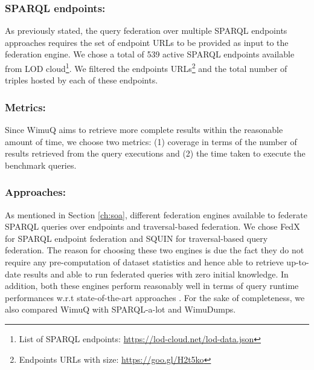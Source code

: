 \subsubsection{SPARQL endpoints:} As previously stated, the query federation over multiple SPARQL endpoints approaches requires the set of endpoint URLs to be provided as input to the federation engine. We chose a total of 539 active SPARQL endpoints available from LOD cloud\footnote{List of SPARQL endpoints: \url{https://lod-cloud.net/lod-data.json}}. We filtered the endpoints URLs\footnote{\label{endpoints}Endpoints URLs with size: \url{https://goo.gl/H2t5ko}} and the total number of triples hosted by each of these endpoints. 

\subsubsection{Metrics:} Since WimuQ aims to retrieve more complete results within the reasonable amount of time, we choose two metrics: (1) coverage in terms of the number of results retrieved from the query executions and (2) the time taken to execute the benchmark queries. 

\subsubsection{Approaches:} As mentioned in Section \ref{ch:soa}, different federation engines available to federate SPARQL queries over endpoints and traversal-based federation. We chose FedX \cite{fedx2011} for SPARQL endpoint federation and SQUIN \cite{hartig2013squin} for traversal-based query federation. The reason for choosing these two engines is due the fact they do not require any pre-computation of dataset statistics and hence able to retrieve up-to-date results and able to run federated queries with zero initial knowledge. In addition, both these engines perform reasonably well in terms of query runtime performances w.r.t state-of-the-art approaches \cite{saleem2015fine,saleem2018costfed,hartig2013squin}. For the sake of completeness, we also compared WimuQ with SPARQL-a-lot and WimuDumps.  

